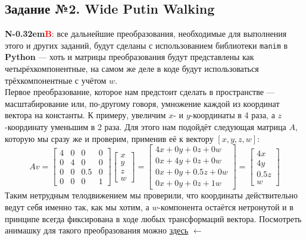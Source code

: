 \documentclass[a3paper,14pt]{extarticle}
\newcommand\NB{\textbf{N\kern-0.32em\textcolor{red}{B}}}
\begin{document}
\subsection*{\centering Задание №2. Wide Putin Walking}
\NB: все дальнейшие преобразования, необходимые для выполнения этого и других заданий, будут сделаны с использованием библиотеки \verb|manim| в \textbf{Python} --- хоть и матрицы преобразования будут представлены как четырёхкомпонентные, на самом же деле в коде будут использоваться трёхкомпонентные с учётом $w$.\\[1.5em]
Первое преобразование, которое нам предстоит сделать в пространстве --- масштабирование или, по-другому говоря, умножение каждой из координат вектора на константы. К примеру, увеличим $x$- и $y$-координаты в 4 раза, а $z$-координату уменьшим в 2 раза. Для этого нам подойдёт следующая матрица $A$, которую мы сразу же и проверим, применив её к вектору $[x, y, z, w]$:
$$Av = \begin{bmatrix}
    4 & 0 & 0 & 0 \\ 0 & 4 & 0 & 0 \\ 0 & 0 & 0.5 & 0 \\ 0 & 0 & 0 & 1
\end{bmatrix}\begin{bmatrix}
    x \\ y \\ z \\ w
\end{bmatrix} = \begin{bmatrix}
    4x + 0y + 0z + 0w \\ 0x + 4y + 0z + 0w \\ 0x + 0y + 0.5z + 0w \\ 0x + 0y + 0z + 1w
\end{bmatrix} = \begin{bmatrix}
    4x \\ 4y \\ 0.5z \\ w
\end{bmatrix}$$
Таким нетрудным телодвижением мы проверили, что координаты действительно ведут себя именно так, как мы хотим, а $w$-компонента остаётся нетронутой и в принципе всегда фиксирована в ходе любых трансформаций вектора. Посмотреть анимашку для такого преобразования можно \href{https://disk.yandex.ru/i/VmQDa1OhRCMm7w}{здесь} $\leftarrow$
\end{document}
